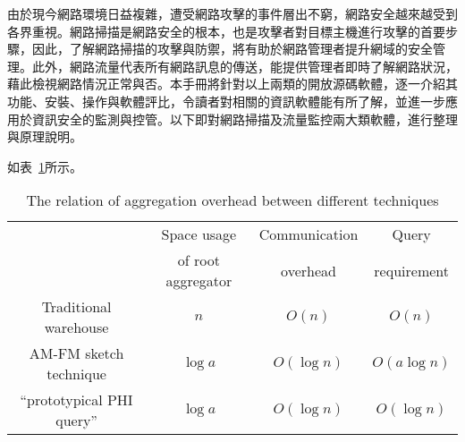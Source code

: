 由於現今網路環境日益複雜，遭受網路攻擊的事件層出不窮，網路安全越來越受到各界重視。網路掃描是網路安全的根本，也是攻擊者對目標主機進行攻擊的首要步驟，因此，了解網路掃描的攻擊與防禦，將有助於網路管理者提升網域的安全管理。此外，網路流量代表所有網路訊息的傳送，能提供管理者即時了解網路狀況，藉此檢視網路情況正常與否。本手冊將針對以上兩類的開放源碼軟體，逐一介紹其功能、安裝、操作與軟體評比，令讀者對相關的資訊軟體能有所了解，並進一步應用於資訊安全的監測與控管。以下即對網路掃描及流量監控兩大類軟體，進行整理與原理說明。
	
如表~\ref{tab:system}所示。 


\begin{table}[hbtp]
  \begin{center}
    \caption{The relation of aggregation overhead between different techniques}
    \label{tab:system}
    \begin{tabular}{|c|c c c|}
      \hline
       & Space usage & Communication & Query \\
       & of root aggregator & overhead & requirement \\
      \hline
      Traditional warehouse & $n$ & $O(n)$ & $O(n)$ \\
      \hline
      AM-FM sketch technique & $\log a$ & $O(\log n)$ &  $O(a\log n)$ \\
      \hline
      ``prototypical PHI query'' & $\log a$ & $O(\log n)$ & $O(\log n)$ \\
      \hline
      \end{tabular}
  \end{center}
\end{table}
